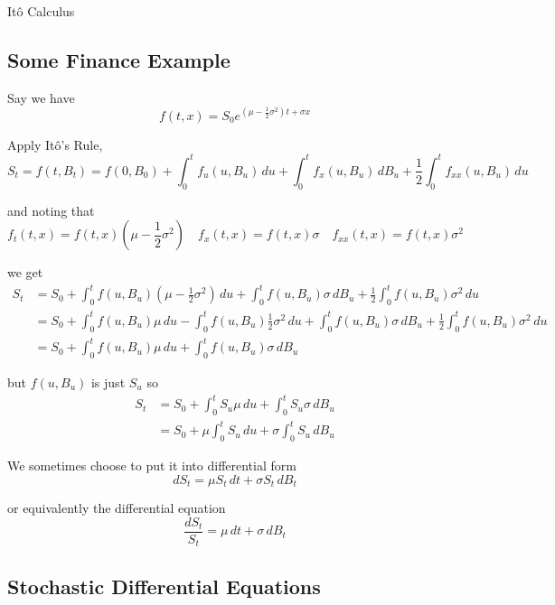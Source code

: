 \documentclass[12pt]{article}
\begin{document}
\begin{section}{It\^{o} Calculus}
\subsection{Some Finance Example}

Say we have
\begin{equation*}
	f(t,x) = S_0e^{(\mu - \frac{1}{2}\sigma^2)t + \sigma x}
\end{equation*}

Apply It\^{o}'s Rule,
\begin{equation*}
	S_t = f(t,B_t) = f(0, B_0) + \int^t_0f_u(u,B_u)\,du + \int^t_0f_x(u,B_u)\,dB_u + \frac{1}{2} \int^t_0f_{xx}(u,B_u)\,du
\end{equation*}

and noting that
\begin{equation*}
	f_t(t,x) = f(t,x)(\mu - \frac{1}{2}\sigma^2) \quad f_x(t,x) = f(t,x)\sigma \quad f_{xx}(t,x) = f(t,x)\sigma^2
\end{equation*}

we get
\begin{align*}
	S_t &= S_0 + \int^t_0f(u,B_u)(\mu -\frac{1}{2}\sigma^2)\,du + \int^t_0 f(u,B_u)\sigma\,dB_u + \frac{1}{2} \int^t_0f(u,B_u)\sigma^2\,du \\
	&= S_0 + \int^t_0f(u,B_u)\mu\,du - \int^t_0f(u,B_u)\frac{1}{2}\sigma^2\,du  + \int^t_0 f(u,B_u)\sigma\,dB_u + \frac{1}{2} \int^t_0f(u,B_u)\sigma^2\,du \\
	&= S_0 + \int^t_0f(u,B_u)\mu\,du + \int^t_0 f(u,B_u)\sigma\,dB_u
\end{align*}

but $f(u,B_u)$ is just $S_u$ so
\begin{align*}
	S_t &= S_0 + \int^t_0S_u\mu\,du + \int^t_0S_u\sigma\,dB_u \\
	&= S_0 + \mu\int^t_0S_u\,du + \sigma\int^t_0S_u\,dB_u
\end{align*}

We sometimes choose to put it into differential form
\begin{equation*}
	dS_t = \mu S_t\,dt + \sigma S_t\,dB_t
\end{equation*}

or equivalently the differential equation
\begin{equation*}
 	\frac{dS_t}{S_t} = \mu\,dt + \sigma\,dB_t
\end{equation*}

\subsection{Stochastic Differential Equations}


\end{section}
\end{document}
